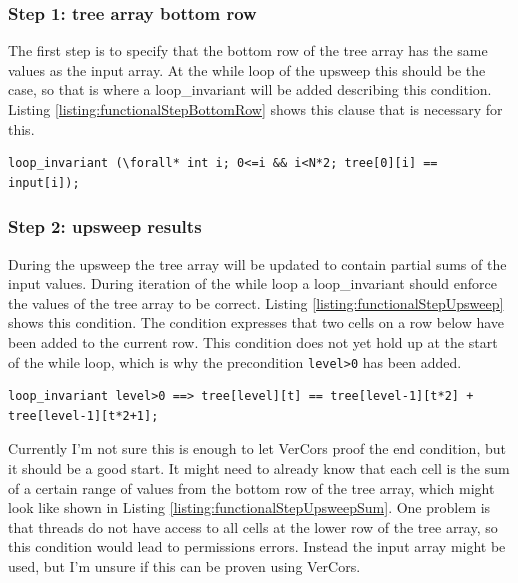 \documentclass[a4paper]{article}
\newcommand{\code}[1]{\texttt{\small \color{inline}#1}} %
\begin{document}
\subsubsection{Step 1: tree array bottom row}
The first step is to specify that the bottom row of the tree array has the same values as the input array. At the while loop of the upsweep this should be the case, so that is where a loop\_invariant will be added describing this condition. Listing \ref{listing:functionalStepBottomRow} shows this clause that is necessary for this.

\begin{lstlisting}[caption=Bottom row of the tree array is equal to the input array, label=listing:functionalStepBottomRow, float=htpb]
loop_invariant (\forall* int i; 0<=i && i<N*2; tree[0][i] == input[i]);
\end{lstlisting}

\subsubsection{Step 2: upsweep results}
During the upsweep the tree array will be updated to contain partial sums of the input values. During iteration of the while loop a loop\_invariant should enforce the values of the tree array to be correct. Listing \ref{listing:functionalStepUpsweep} shows this condition. The condition expresses that two cells on a row below have been added to the current row. This condition does not yet hold up at the start of the while loop, which is why the precondition \code{level>0} has been added.

\begin{lstlisting}[caption=Upsweep loop\_invariant enforcing the results of the computation, label=listing:functionalStepUpsweep, float=htpb]
loop_invariant level>0 ==> tree[level][t] == tree[level-1][t*2] + tree[level-1][t*2+1];
\end{lstlisting}

Currently I'm not sure this is enough to let VerCors proof the end condition, but it should be a good start. It might need to already know that each cell is the sum of a certain range of values from the bottom row of the tree array, which might look like shown in Listing \ref{listing:functionalStepUpsweepSum}. One problem is that threads do not have access to all cells at the lower row of the tree array, so this condition would lead to permissions errors. Instead the input array might be used, but I'm unsure if this can be proven using VerCors. 
\end{document}
